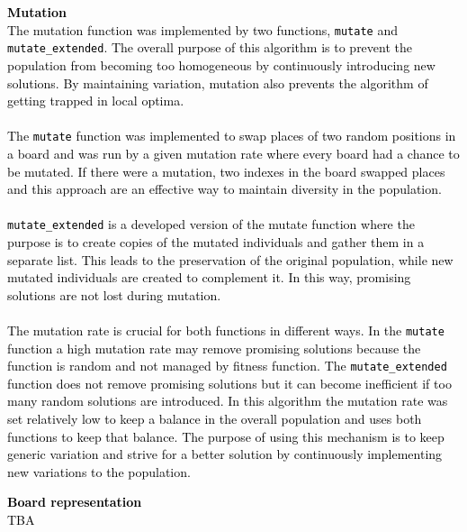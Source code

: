 \documentclass{scrartcl}
\begin{document}
\textcolor{black}{\textbf{Mutation \\} The mutation function was implemented by two functions, \texttt{mutate} and \texttt{mutate\_extended}. The overall purpose of this algorithm is to prevent the population from becoming too homogeneous by continuously introducing new solutions. By maintaining variation, mutation also prevents the algorithm of getting trapped in local optima. \\ \\ The \texttt{mutate} function was implemented to swap places of two random positions in a board and was run by a given mutation rate where every board had a chance to be mutated. If there were a mutation, two indexes in the board swapped places and this approach are an effective way to maintain diversity in the population. \\ \\\texttt{mutate\_extended} is a developed version of the mutate function where the purpose is to create copies of the mutated individuals and gather them in a separate list. This leads to the preservation of the original population, while new mutated individuals are created to complement it. In this way, promising solutions are not lost during mutation. \\ \\The mutation rate is crucial for both functions in different ways. In the \texttt{mutate} function a high mutation rate may remove promising solutions because the function is random and not managed by fitness function. The \texttt{mutate\_extended} function does not remove promising solutions but it can become inefficient if too many random solutions are introduced. In this algorithm the mutation rate was set relatively low to keep a balance in the overall population and uses both functions to keep that balance. The purpose of using this mechanism is to keep generic variation and strive for a better solution by continuously implementing new variations to the population.}

\textcolor{black}{\textbf{Board representation \\} TBA}
\end{document}
